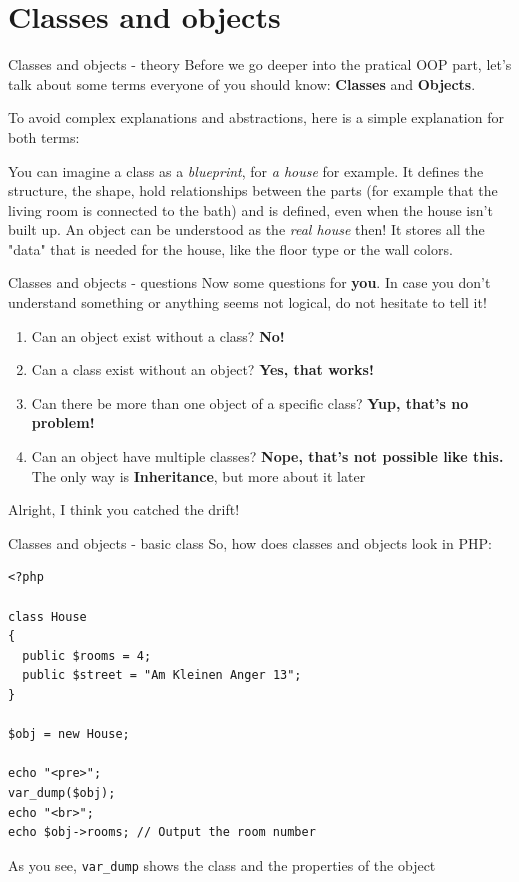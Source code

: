 \section{Classes and objects}

\begin{frame}{Classes and objects - theory}
	Before we go deeper into the pratical OOP part, let's talk about some terms everyone of you should know: \textbf{Classes} and \textbf{Objects}. \pause
	
	To avoid complex explanations and abstractions, here is a simple explanation for both terms: \pause
	
	You can imagine a class as a \emph{blueprint}, for \emph{a house} for example. It defines the structure, the shape, hold relationships between the parts (for example that the living room is connected to the bath) and is defined, even when the house isn't built up. \pause
	An object can be understood as the \emph{real house} then! It stores all the "data" that is needed for the house, like the floor type or the wall colors. \pause
\end{frame}

\begin{frame}{Classes and objects - questions}
	Now some questions for \textbf{you}. In case you don't understand something or anything seems not logical, do not hesitate to tell it!
	
	\begin{enumerate}
	\item Can an object exist without a class? \pause \textbf{No!}
	\item Can a class exist without an object? \pause \textbf{Yes, that works!}
	\item Can there be more than one object of a specific class? \pause \textbf{Yup, that's no problem!}
	\item Can an object have multiple classes? \pause \textbf{Nope, that's not possible like this.}  The only way is \textbf{Inheritance}, but more about it later
	\end{enumerate} \pause
	
	Alright, I think you catched the drift!
	
\end{frame}

\begin{frame}[fragile]{Classes and objects - basic class}
	So, how does classes and objects look in PHP: \pause
	\begin{lstlisting}
<?php
 
class House
{
  public $rooms = 4;
  public $street = "Am Kleinen Anger 13";
}
 
$obj = new House;

echo "<pre>";
var_dump($obj);
echo "<br>";
echo $obj->rooms; // Output the room number
\end{lstlisting}
	
\pause As you see, \texttt{var\_{}dump} shows the class and the properties of the object
\end{frame}

